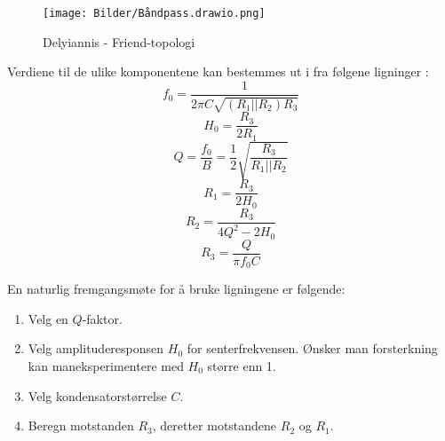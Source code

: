\begin{figure} [!h]
\centering
\texttt{[image: Bilder/Båndpass.drawio.png]}
\caption{Delyiannis - Friend-topologi}
\label{fig:SallenKey}
\end{figure}
\newpage
Verdiene til de ulike komponentene kan bestemmes ut i fra følgene ligninger \cite{Active Filter}:
\begin{equation}
    \label{eq:f}
    f_0 = \frac{1}{2 \pi C \sqrt{(R_1||R_2)R_3}}
\end{equation}
\begin{equation}
    \label{eq:h}
    H_0 = \frac{R_3}{2R_1}
\end{equation}
\begin{equation}
    \label{eq:q}
    Q = \frac{f_0}{B} = \frac{1}{2} \sqrt{\frac{R_3}{R_1||R_2}}
\end{equation}
\begin{equation}
    \label{eq:r1}
    R_1 = \frac{R_3}{2H_0}
\end{equation}
\begin{equation}
    \label{eq:r2}
    R_2 = \frac{R_3}{4Q^2 -2H_0}
\end{equation}
\begin{equation}
    \label{eq:r3}
    R_3 = \frac{Q}{\pi f_0 C}
\end{equation}

En naturlig fremgangsmøte for å bruke ligningene er følgende\cite{støygenerator}:
\begin{enumerate}
    \item Velg en $Q$-faktor.
    \item Velg amplituderesponsen $H_0$ for senterfrekvensen. Ønsker man forsterkning kan maneksperimentere med $H_0$ større enn 1.
    \item Velg kondensatorstørrelse $C$.
    \item Beregn motstanden $R_3$, deretter motstandene $R_2$ og $R_1$.
\end{enumerate}
